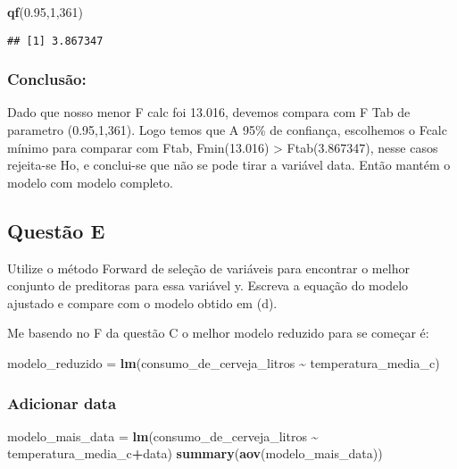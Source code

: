 \documentclass[
]{article}
\newenvironment{Shaded}{\begin{snugshade}}{\end{snugshade}}
\newcommand{\DecValTok}[1]{\textcolor[rgb]{0.00,0.00,0.81}{#1}}
\newcommand{\FloatTok}[1]{\textcolor[rgb]{0.00,0.00,0.81}{#1}}
\newcommand{\FunctionTok}[1]{\textcolor[rgb]{0.13,0.29,0.53}{\textbf{#1}}}
\newcommand{\NormalTok}[1]{#1}
\newcommand{\OtherTok}[1]{\textcolor[rgb]{0.56,0.35,0.01}{#1}}
\newcommand{\SpecialCharTok}[1]{\textcolor[rgb]{0.81,0.36,0.00}{\textbf{#1}}}
\begin{document}
\begin{Shaded}
\begin{Highlighting}[]
\FunctionTok{qf}\NormalTok{(}\FloatTok{0.95}\NormalTok{,}\DecValTok{1}\NormalTok{,}\DecValTok{361}\NormalTok{)}
\end{Highlighting}
\end{Shaded}

\begin{verbatim}
## [1] 3.867347
\end{verbatim}

\hypertarget{conclusuxe3o-2}{%
\subsubsection{Conclusão:}\label{conclusuxe3o-2}}

Dado que nosso menor F calc foi 13.016, devemos compara com F Tab de
parametro (0.95,1,361). Logo temos que A 95\% de confiança, escolhemos o
Fcalc mínimo para comparar com Ftab, Fmin(13.016) \textgreater{}
Ftab(3.867347), nesse casos rejeita-se Ho, e conclui-se que não se pode
tirar a variável data. Então mantém o modelo com modelo completo.

\hypertarget{questuxe3o-e}{%
\subsection{Questão E}\label{questuxe3o-e}}

Utilize o método Forward de seleção de variáveis para encontrar o melhor
conjunto de preditoras para essa variável y. Escreva a equação do modelo
ajustado e compare com o modelo obtido em (d).

Me basendo no F da questão C o melhor modelo reduzido para se começar é:

\begin{Shaded}
\begin{Highlighting}[]
\NormalTok{modelo\_reduzido }\OtherTok{=} \FunctionTok{lm}\NormalTok{(consumo\_de\_cerveja\_litros }\SpecialCharTok{\textasciitilde{}}\NormalTok{ temperatura\_media\_c)}
\end{Highlighting}
\end{Shaded}

\hypertarget{adicionar-data}{%
\subsubsection{Adicionar data}\label{adicionar-data}}

\begin{Shaded}
\begin{Highlighting}[]
\NormalTok{modelo\_mais\_data }\OtherTok{=} \FunctionTok{lm}\NormalTok{(consumo\_de\_cerveja\_litros }\SpecialCharTok{\textasciitilde{}}\NormalTok{ temperatura\_media\_c}\SpecialCharTok{+}\NormalTok{data)}
\FunctionTok{summary}\NormalTok{(}\FunctionTok{aov}\NormalTok{(modelo\_mais\_data))}
\end{Highlighting}
\end{Shaded}
\end{document}
